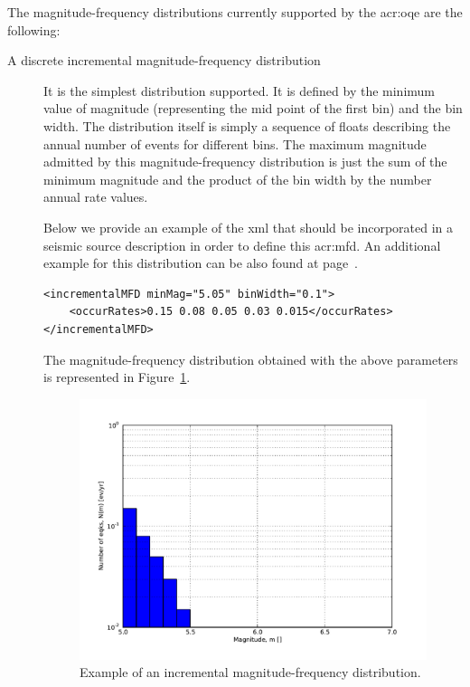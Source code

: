 The magnitude-frequency distributions currently supported by the
\gls{acr:oqe} are the following:

\begin{description}


\item[A discrete incremental magnitude-frequency distribution]

It is the simplest distribution supported. It is defined by the minimum value
of magnitude (representing the mid point of the first bin) and the bin width.
The distribution itself is simply a sequence of floats describing the annual
number of events for different bins. The maximum magnitude admitted by this
magnitude-frequency distribution is just the sum of the minimum magnitude and
the product of the bin width by the number annual rate values.

Below we provide an example of the xml that should be incorporated in a
seismic source description in order to define this \gls{acr:mfd}. An
additional example for this distribution can be also found at
page~\pageref{example_incremental_mfd}.

\begin{Verbatim}[frame=single, commandchars=\\\{\}, fontsize=\footnotesize]
<incrementalMFD minMag="5.05" binWidth="0.1">
    <occurRates>0.15 0.08 0.05 0.03 0.015</occurRates>
</incrementalMFD>
\end{Verbatim}

The magnitude-frequency distribution obtained with the above parameters is
represented in Figure~\ref{fig:evenly_discretized_mfd}.

\begin{figure}[!ht]
\centering
\includegraphics[width=12cm]{figures/hazard/ed_mfd.pdf}
\caption{Example of an incremental magnitude-frequency distribution.}
\label{fig:evenly_discretized_mfd}
\end{figure}




\end{description}
